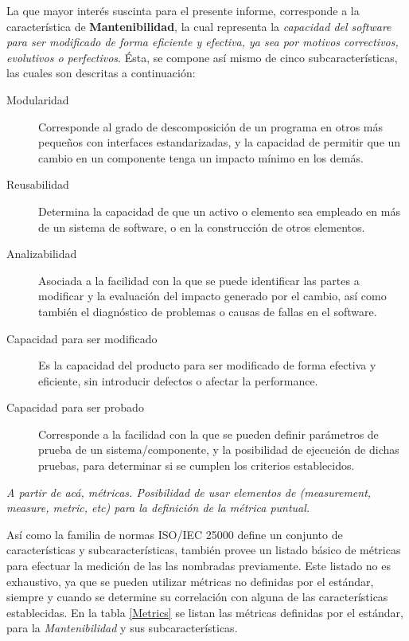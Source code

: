 La que mayor interés suscinta para el presente informe, corresponde a la característica
de \textbf{Mantenibilidad}, la cual representa la \textit{capacidad del software para ser modificado
de forma eficiente y efectiva, ya sea por motivos correctivos, evolutivos o perfectivos}.
Ésta, se compone así mismo de cinco subcaracterísticas, las cuales son descritas
a continuación:
\begin{description}
    \item [Modularidad] Corresponde al grado de descomposición de un programa en otros más pequeños
    con interfaces estandarizadas, y la capacidad de permitir que un cambio en un componente tenga
    un impacto mínimo en los demás.
    \item [Reusabilidad] Determina la capacidad de que un activo o elemento sea empleado en más
    de un sistema de software, o en la construcción de otros elementos.
    \item [Analizabilidad] Asociada a la facilidad con la que se puede identificar las partes
    a modificar y la evaluación del impacto generado por el cambio, así como también el diagnóstico
    de problemas o causas de fallas en el software.
    \item [Capacidad para ser modificado] Es la capacidad del producto para ser modificado de
    forma efectiva y eficiente, sin introducir defectos o afectar la performance.
    \item [Capacidad para ser probado] Corresponde a la facilidad con la que se pueden definir
    parámetros de prueba de un sistema/componente, y la posibilidad de ejecución de dichas pruebas,
    para determinar si se cumplen los criterios establecidos.
\end{description}

\textit{A partir de acá, métricas.
Posibilidad de usar elementos de (measurement, measure, metric, etc) para la definición de
la métrica puntual.}

Así como la familia de normas ISO/IEC 25000 define un conjunto de características y
subcaracterísticas, también provee un listado básico de métricas para efectuar la
medición de las las nombradas previamente.
Este listado no es exhaustivo, ya que se pueden utilizar métricas no definidas por el
estándar, siempre y cuando se determine su correlación con alguna de las características
establecidas.
En la tabla \ref{Metrics} se listan las métricas definidas por el estándar, para la \textit{Mantenibilidad}
y sus subcaracterísticas.

